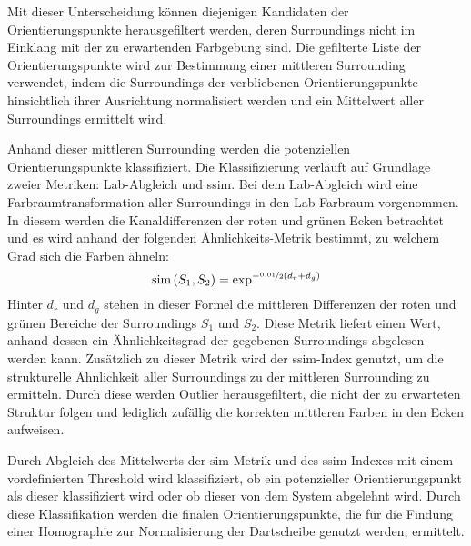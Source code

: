 Mit dieser Unterscheidung können diejenigen Kandidaten der Orientierungspunkte herausgefiltert werden, deren Surroundings nicht im Einklang mit der zu erwartenden Farbgebung sind. Die gefilterte Liste der Orientierungspunkte wird zur Bestimmung einer mittleren Surrounding verwendet, indem die Surroundings der verbliebenen Orientierungspunkte hinsichtlich ihrer Ausrichtung normalisiert werden und ein Mittelwert aller Surroundings ermittelt wird.

Anhand dieser mittleren Surrounding werden die potenziellen Orientierungspunkte klassifiziert. Die Klassifizierung verläuft auf Grundlage zweier Metriken: Lab-Abgleich und \ac{ssim}. Bei dem Lab-Abgleich wird eine Farbraumtransformation aller Surroundings in den Lab-Farbraum vorgenommen. In diesem werden die Kanaldifferenzen der roten und grünen Ecken betrachtet und es wird anhand der folgenden Ähnlichkeits-Metrik bestimmt, zu welchem Grad sich die Farben ähneln:
\[\text{sim}\left(S_1, S_2\right) = \exp^{-\nicefrac{0.01}{2}(d_r + d_g)}\]
Hinter $d_r$ und $d_g$ stehen in dieser Formel die mittleren Differenzen der roten und grünen Bereiche der Surroundings $S_1$ und $S_2$. Diese Metrik liefert einen Wert, anhand dessen ein Ähnlichkeitsgrad der gegebenen Surroundings abgelesen werden kann. Zusätzlich zu dieser Metrik wird der \ac{ssim}-Index genutzt, um die strukturelle Ähnlichkeit aller Surroundings zu der mittleren Surrounding zu ermitteln. Durch diese werden Outlier herausgefiltert, die nicht der zu erwarteten Struktur folgen und lediglich zufällig die korrekten mittleren Farben in den Ecken aufweisen.

Durch Abgleich des Mittelwerts der $\text{sim}$-Metrik und des \ac{ssim}-Indexes mit einem vordefinierten Threshold wird klassifiziert, ob ein potenzieller Orientierungspunkt als dieser klassifiziert wird oder ob dieser von dem System abgelehnt wird. Durch diese Klassifikation werden die finalen Orientierungspunkte, die für die Findung einer Homographie zur Normalisierung der Dartscheibe genutzt werden, ermittelt.
